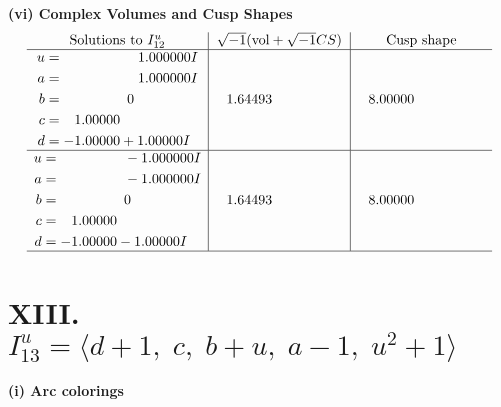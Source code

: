 \documentclass[1p]{elsarticle_modified}
\theoremstyle{definition}
\newcommand{\I}{\sqrt{-1}}
\begin{document}
\newpage\flushleft \textbf{(vi) Complex Volumes and Cusp Shapes}
$$\begin{array}{c|c|c}  
\text{Solutions to }I^u_{12}& \I (\text{vol} + \sqrt{-1}CS) & \text{Cusp shape}\\
 \hline 
\begin{aligned}
u &= \phantom{-0.000000 -}1.000000 I \\
a &= \phantom{-0.000000 -}1.000000 I \\
b &= \phantom{-0.000000 } 0 \\
c &= \phantom{-}1.00000\phantom{ +0.000000I} \\
d &= -1.00000 + 1.00000 I\end{aligned}
 & \phantom{-}1.64493\phantom{ +0.000000I} & \phantom{-}8.00000\phantom{ +0.000000I} \\ \hline\begin{aligned}
u &= \phantom{-0.000000 } -1.000000 I \\
a &= \phantom{-0.000000 } -1.000000 I \\
b &= \phantom{-0.000000 } 0 \\
c &= \phantom{-}1.00000\phantom{ +0.000000I} \\
d &= -1.00000 - 1.00000 I\end{aligned}
 & \phantom{-}1.64493\phantom{ +0.000000I} & \phantom{-}8.00000\phantom{ +0.000000I}\\
 \hline 
 \end{array}$$\newpage\newpage\renewcommand{\arraystretch}{1}
\centering \section*{XIII. $I^u_{13}= \langle d+1,\;c,\;b+u,\;a-1,\;u^2+1 \rangle$}
\flushleft \textbf{(i) Arc colorings}\\
\end{document}
